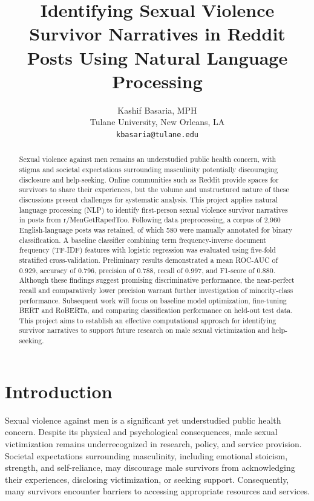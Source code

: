 \documentclass[11pt,a4paper]{article}
\title{Identifying Sexual Violence Survivor Narratives in Reddit Posts Using Natural Language Processing}
\author{Kashif Basaria, MPH \\
  Tulane University, New Orleans, LA \\
  \texttt{kbasaria@tulane.edu}
  }
\date{}
\begin{document}
\setlength{\parskip}{0pt}
\maketitle
\begin{abstract}

Sexual violence against men remains an understudied public health concern, with stigma and societal expectations surrounding masculinity potentially discouraging disclosure and help-seeking. Online communities such as Reddit provide spaces for survivors to share their experiences, but the volume and unstructured nature of these discussions present challenges for systematic analysis. This project applies natural language processing (NLP) to identify first-person sexual violence survivor narratives in posts from r/MenGetRapedToo. Following data preprocessing, a corpus of 2,960 English-language posts was retained, of which 580 were manually annotated for binary classification. A baseline classifier combining term frequency-inverse document frequency (TF-IDF) features with logistic regression was evaluated using five-fold stratified cross-validation. Preliminary results demonstrated a mean ROC-AUC of 0.929, accuracy of 0.796, precision of 0.788, recall of 0.997, and F1-score of 0.880. Although these findings suggest promising discriminative performance, the near-perfect recall and comparatively lower precision warrant further investigation of minority-class performance. Subsequent work will focus on baseline model optimization, fine-tuning BERT and RoBERTa, and comparing classification performance on held-out test data. This project aims to establish an effective computational approach for identifying survivor narratives to support future research on male sexual victimization and help-seeking.

\end{abstract}


\section{Introduction}

Sexual violence against men is a significant yet understudied public health concern. Despite its physical and psychological consequences, male sexual victimization remains underrecognized in research, policy, and service provision. Societal expectations surrounding masculinity, including emotional stoicism, strength, and self-reliance, may discourage male survivors from acknowledging their experiences, disclosing victimization, or seeking support. Consequently, many survivors encounter barriers to accessing appropriate resources and services.
\end{document}
